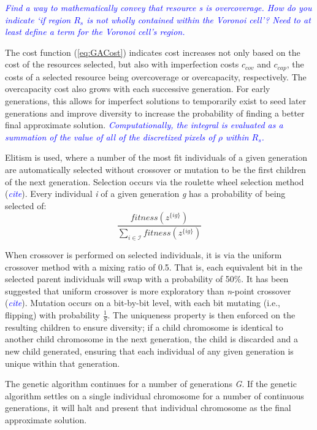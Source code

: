 \documentclass[12pt,onecolumn]{IEEEtran}
\begin{document}
\textcolor{blue}{\textit{Find a way to mathematically convey that resource \textit{s} is overcoverage.  How do you indicate `if region $R_s$ is not wholly contained within the Voronoi cell'?  Need to at least define a term for the Voronoi cell's region.}}

The cost function (\ref{eq:GACost}) indicates cost increases not only based on the cost of the resources selected, but also with imperfection costs $c_{cov}$ and $c_{cap}$, the costs of a selected resource being overcoverage or overcapacity, respectively.  The overcapacity cost also grows with each successive generation.  For early generations, this allows for imperfect solutions to temporarily exist to seed later generations and improve diversity to increase the probability of finding a better final approximate solution.  \textcolor{blue}{\textit{Computationally, the integral is evaluated as a summation of the value of all of the discretized pixels of $\rho$ within $R_s$.}}

Elitism is used, where a number of the most fit individuals of a given generation are automatically selected without crossover or mutation to be the first children of the next generation.  Selection occurs via the roulette wheel selection method (\textcolor{blue}{\textit{cite}}).  Every individual \textit{i} of a given generation \textit{g} has a probability of being selected of:
\[
\frac{fitness\left( z^{\{ig\}} \right)}{\sum_{i \in \mathcal{I}} fitness\left( z^{\{ig\}} \right)}
\]

When crossover is performed on selected individuals, it is via the uniform crossover method with a mixing ratio of 0.5.  That is, each equivalent bit in the selected parent individuals will swap with a probability of 50\%.  It has been suggested that uniform crossover is more exploratory than \textit{n}-point crossover (\textcolor{blue}{\textit{cite}}).  Mutation occurs on a bit-by-bit level, with each bit mutating (i.e., flipping) with probability $\frac{1}{S}$.  The uniqueness property is then enforced on the resulting children to ensure diversity; if a child chromosome is identical to another child chromosome in the next generation, the child is discarded and a new child generated, ensuring that each individual of any given generation is unique within that generation.

The genetic algorithm continues for a number of generations \textit{G}.  If the genetic algorithm settles on a single individual chromosome for a number of continuous generations, it will halt and present that individual chromosome as the final approximate solution.
\end{document}
